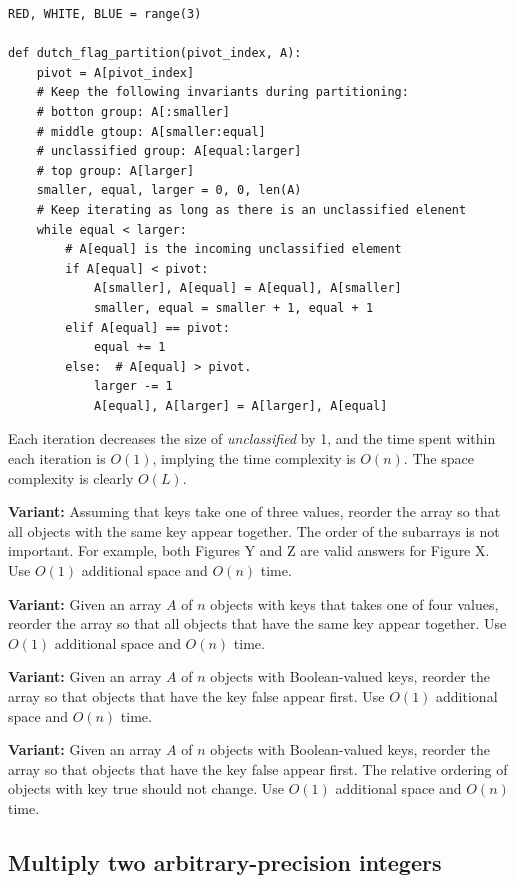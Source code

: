 \documentclass[11pt,a4paper]{article}
\begin{document}
\begin{verbatim}
RED, WHITE, BLUE = range(3)

def dutch_flag_partition(pivot_index, A):
    pivot = A[pivot_index]
    # Keep the following invariants during partitioning:
    # botton group: A[:smaller]
    # middle gtoup: A[smaller:equal]
    # unclassified group: A[equal:larger]
    # top group: A[larger]
    smaller, equal, larger = 0, 0, len(A)
    # Keep iterating as long as there is an unclassified elenent
    while equal < larger:
        # A[equal] is the incoming unclassified element
        if A[equal] < pivot:
            A[smaller], A[equal] = A[equal], A[smaller]
            smaller, equal = smaller + 1, equal + 1 
        elif A[equal] == pivot:
            equal += 1
        else:  # A[equal] > pivot.
            larger -= 1
            A[equal], A[larger] = A[larger], A[equal]
\end{verbatim}

Each iteration decreases the size of \emph{unclassified} by 1, and the time
spent within each iteration is $O(1)$, implying the time complexity is $O(n)$.
The space complexity is clearly $O(L)$.

\textbf{Variant:} Assuming that keys take one of three values, reorder the
array so that all objects with the same key appear together. The order of the
subarrays is not important. For example, both Figures Y and Z are valid
answers for Figure X. Use $O(1)$ additional space and $O(n)$ time.

\textbf{Variant:} Given an array $A$ of $n$ objects with keys that takes one
of four values, reorder the array so that all objects that have the same key
appear together. Use $O(1)$ additional space and $O(n)$ time.

\textbf{Variant:} Given an array $A$ of $n$ objects with Boolean-valued keys,
reorder the array so that objects that have the key false appear first. Use
$O(1)$ additional space and $O(n)$ time.

\textbf{Variant:} Given an array $A$ of $n$ objects with Boolean-valued keys,
reorder the array so that objects that have the key false appear first. The
relative ordering of objects with key true should not change. Use $O(1)$
additional space and $O(n)$ time.

\subsection{Multiply two arbitrary-precision integers}
\end{document}

